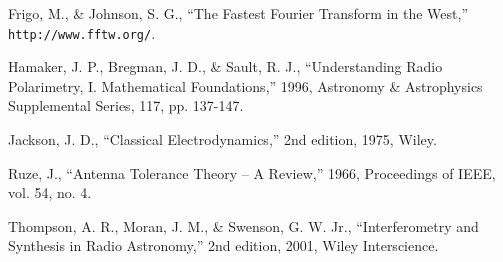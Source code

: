 \documentclass{article}
\begin{document}
\noindent
Frigo, M., \& Johnson, S. G., ``The Fastest Fourier Transform in the West,'' 
{\tt http://www.fftw.org/}.

\vspace{10pt}

\noindent
Hamaker, J. P., Bregman, J. D., \& Sault, R. J., ``Understanding Radio
Polarimetry, I. Mathematical Foundations,'' 1996,
Astronomy \& Astrophysics Supplemental Series, 117, pp. 137-147.

\vspace{10pt}

\noindent
Jackson, J. D., ``Classical Electrodynamics,'' 2nd edition, 1975, Wiley.

\vspace{10pt}

\noindent
Ruze, J., ``Antenna Tolerance Theory -- A Review,'' 1966, Proceedings of IEEE,
vol. 54, no. 4.

\vspace{10pt}

\noindent
Thompson, A. R., Moran, J. M., \& Swenson, G. W. Jr., ``Interferometry and
Synthesis in Radio Astronomy,'' 2nd edition, 2001, Wiley Interscience.
\end{document}
